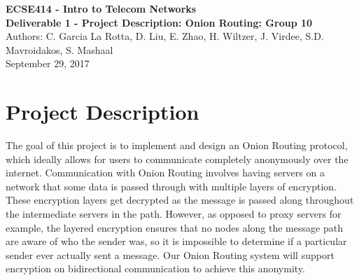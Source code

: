 \documentclass[10pt]{article}
\begin{document}
\noindent
\large \textbf{ECSE414 - Intro to Telecom Networks\\Deliverable 1 - Project Description: Onion Routing: Group 10}\\
Authors: C. Garcia La Rotta, D. Liu, E. Zhao, H. Wiltzer, J. Virdee, S.D. Mavroidakos, S. Mashaal\\
September 29, 2017

\section*{Project Description}
The goal of this project is to implement and design an Onion Routing protocol,
which ideally allows for users to communicate completely anonymously over the
internet. Communication with Onion Routing involves having servers on a network that some
data is passed through with multiple layers of encryption. These encryption layers get decrypted as
the message is passed along throughout the intermediate servers in the path.
However, as opposed to proxy servers for example,
the layered encryption ensures that no nodes along the
message path are aware of who the sender was, so it is impossible to determine
if a particular sender ever actually sent a message. Our Onion Routing
system will support encryption on bidirectional communication to achieve this
anonymity.\\
\end{document}
